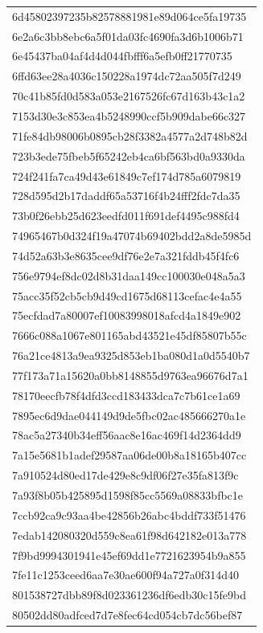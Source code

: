 \begin{tabular}{l}
6d45802397235b82578881981e89d064ce5fa19735 \\
6e2a6c3bb8ebc6a5f01da03fc4690fa3d6b1006b71 \\
6e45437ba04af4d4d044fbfff6a5efb0ff21770735 \\
6ffd63ee28a4036c150228a1974dc72aa505f7d249 \\
70c41b85fd0d583a053e2167526fc67d163b43c1a2 \\
7153d30e3c853ea4b5248990ccf5b909dabe66c327 \\
71fe84db98006b0895cb28f3382a4577a2d748b82d \\
723b3ede75fbeb5f65242eb4ca6bf563bd0a9330da \\
724f241fa7ca49d43e61849c7ef174d785a6079819 \\
728d595d2b17daddf65a53716f4b24fff2fdc7da35 \\
73b0f26ebb25d623eedfd011f691def4495c988fd4 \\
74965467b0d324f19a47074b69402bdd2a8de5985d \\
74d52a63b3e8635cee9df76e2e7a321fddb45f4fc6 \\
756e9794ef8dc02d8b31daa149cc100030e048a5a3 \\
75acc35f52cb5cb9d49cd1675d68113cefac4e4a55 \\
75ecfdad7a80007ef10083998018afcd4a1849e902 \\
7666c088a1067e801165abd43521e45df85807b55c \\
76a21ce4813a9ea9325d853eb1ba080d1a0d5540b7 \\
77f173a71a15620a0bb8148855d9763ea96676d7a1 \\
78170eecfb78f4dfd3ccd183433dca7c7b61ce1a69 \\
7895ec6d9dae044149d9de5fbc02ac485666270a1e \\
78ac5a27340b34eff56aac8e16ac469f14d2364dd9 \\
7a15e5681b1adef29587aa06de00b8a18165b407cc \\
7a910524d80ed17de429e8c9df06f27e35fa813f9c \\
7a93f8b05b425895d1598f85cc5569a08833bfbc1e \\
7ccb92ca9c93aa4be42856b26abc4bddf733f51476 \\
7edab142080320d559c8ea61f98d642182e013a778 \\
7f9bd9994301941e45ef69dd1e7721623954b9a855 \\
7fe11c1253ceed6aa7e30ae600f94a727a0f314d40 \\
801538727dbb89f8d023361236df6edb30c15fe9bd \\
80502dd80adfced7d7e8fec64cd054cb7dc56bef87 \\

\end{tabular}
